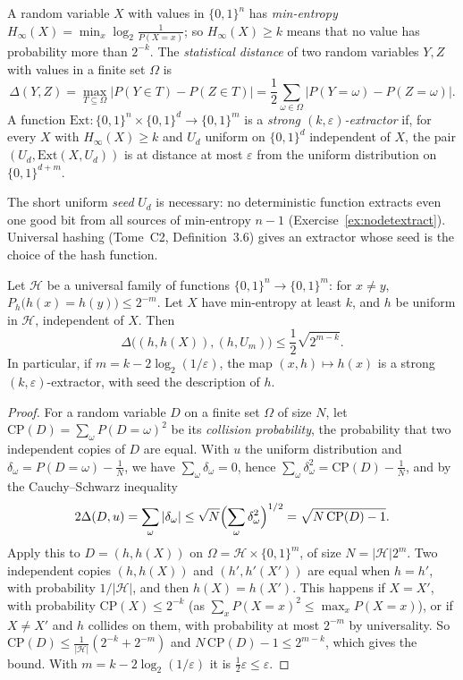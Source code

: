 \begin{definition}\label{def:extractor}
A random variable $X$ with values in $\{0,1\}^n$ has \emph{min-entropy} $H_\infty(X)=\min_x\log_2\frac1{P(X=x)}$; so $H_\infty(X)\ge k$ means that no value has probability more than $2^{-k}$. The \emph{statistical distance} of two random variables $Y,Z$ with values in a finite set $\Omega$ is
\[
\Delta(Y,Z)=\max_{T\subseteq\Omega}\bigl|P(Y\in T)-P(Z\in T)\bigr|=\frac12\sum_{\omega\in\Omega}\bigl|P(Y=\omega)-P(Z=\omega)\bigr|.
\]
A function $\mathrm{Ext}:\{0,1\}^n\times\{0,1\}^d\to\{0,1\}^m$ is a \emph{strong $(k,\varepsilon)$-extractor} if, for every $X$ with $H_\infty(X)\ge k$ and $U_d$ uniform on $\{0,1\}^d$ independent of $X$, the pair $(U_d,\mathrm{Ext}(X,U_d))$ is at distance at most $\varepsilon$ from the uniform distribution on $\{0,1\}^{d+m}$.
\end{definition}

The short uniform \emph{seed} $U_d$ is necessary: no deterministic function extracts even one good bit from all sources of min-entropy $n-1$ (Exercise~\ref{ex:nodetextract}). Universal hashing (Tome~C2, Definition~3.6) gives an extractor whose seed is the choice of the hash function.

\begin{theorem}\label{thm:lhl}
Let $\mathcal H$ be a universal family of functions $\{0,1\}^n\to\{0,1\}^m$: for $x\ne y$, $P_h\bigl(h(x)=h(y)\bigr)\le2^{-m}$. Let $X$ have min-entropy at least $k$, and $h$ be uniform in $\mathcal H$, independent of $X$. Then
\[
\Delta\bigl((h,h(X)),(h,U_m)\bigr)\le\frac12\sqrt{2^{m-k}}.
\]
In particular, if $m=k-2\log_2(1/\varepsilon)$, the map $(x,h)\mapsto h(x)$ is a strong $(k,\varepsilon)$-extractor, with seed the description of $h$.
\end{theorem}

\begin{proof}
For a random variable $D$ on a finite set $\Omega$ of size $N$, let $\mathrm{CP}(D)=\sum_\omega P(D=\omega)^2$ be its \emph{collision probability}, the probability that two independent copies of $D$ are equal. With $u$ the uniform distribution and $\delta_\omega=P(D=\omega)-\frac1N$, we have $\sum_\omega\delta_\omega=0$, hence $\sum_\omega\delta_\omega^2=\mathrm{CP}(D)-\frac1N$, and by the Cauchy--Schwarz inequality
\[
2\Delta(D,u)=\sum_\omega|\delta_\omega|\le\sqrt N\Bigl(\sum_\omega\delta_\omega^2\Bigr)^{1/2}=\sqrt{N\,\mathrm{CP}(D)-1}.
\]
Apply this to $D=(h,h(X))$ on $\Omega=\mathcal H\times\{0,1\}^m$, of size $N=|\mathcal H|2^m$. Two independent copies $(h,h(X))$ and $(h',h'(X'))$ are equal when $h=h'$, with probability $1/|\mathcal H|$, and then $h(X)=h(X')$. This happens if $X=X'$, with probability $\mathrm{CP}(X)\le2^{-k}$ (as $\sum_xP(X=x)^2\le\max_xP(X=x)$), or if $X\ne X'$ and $h$ collides on them, with probability at most $2^{-m}$ by universality. So $\mathrm{CP}(D)\le\frac1{|\mathcal H|}(2^{-k}+2^{-m})$ and $N\,\mathrm{CP}(D)-1\le2^{m-k}$, which gives the bound. With $m=k-2\log_2(1/\varepsilon)$ it is $\frac12\varepsilon\le\varepsilon$.
\end{proof}

